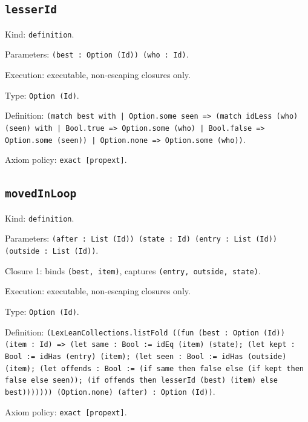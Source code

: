 \documentclass[11pt]{article}
\begin{document}
\subsection*{\texttt{lesserId}}
\noindent Kind: \texttt{definition}.\par
\noindent Parameters: \texttt{(best : Option (Id)) (who : Id)}.\par
\noindent Execution: executable, non-escaping closures only.\par
\noindent Type: \texttt{Option (Id)}.\par
\noindent Definition: \texttt{(match best with | Option.some seen => (match idLess (who) (seen) with | Bool.true => Option.some (who) | Bool.false => Option.some (seen)) | Option.none => Option.some (who))}.\par
\noindent Axiom policy: \texttt{exact [propext]}.\par
\subsection*{\texttt{movedInLoop}}
\noindent Kind: \texttt{definition}.\par
\noindent Parameters: \texttt{(after : List (Id)) (state : Id) (entry : List (Id)) (outside : List (Id))}.\par
\noindent Closure 1: binds \texttt{(best, item)}, captures \texttt{(entry, outside, state)}.\par
\noindent Execution: executable, non-escaping closures only.\par
\noindent Type: \texttt{Option (Id)}.\par
\noindent Definition: \texttt{(LexLeanCollections.listFold ((fun (best : Option (Id)) (item : Id) => (let same : Bool := idEq (item) (state); (let kept : Bool := idHas (entry) (item); (let seen : Bool := idHas (outside) (item); (let offends : Bool := (if same then false else (if kept then false else seen)); (if offends then lesserId (best) (item) else best))))))) (Option.none) (after) : Option (Id))}.\par
\noindent Axiom policy: \texttt{exact [propext]}.\par
\end{document}
